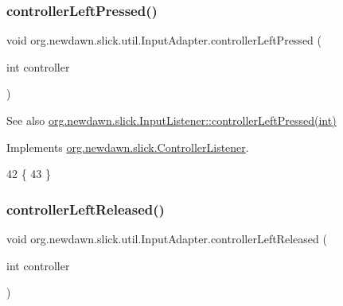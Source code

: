 \subsubsection{\texorpdfstring{controller\+Left\+Pressed()}{controllerLeftPressed()}}
{\footnotesize\ttfamily void org.\+newdawn.\+slick.\+util.\+Input\+Adapter.\+controller\+Left\+Pressed (\begin{DoxyParamCaption}\item[{int}]{controller }\end{DoxyParamCaption})\hspace{0.3cm}{\ttfamily [inline]}}

\begin{DoxySeeAlso}{See also}
\mbox{\hyperlink{interfaceorg_1_1newdawn_1_1slick_1_1_controller_listener_abfb38c5d8e44b7613a49cbfaf19d5585}{org.\+newdawn.\+slick.\+Input\+Listener\+::controller\+Left\+Pressed(int)}} 
\end{DoxySeeAlso}


Implements \mbox{\hyperlink{interfaceorg_1_1newdawn_1_1slick_1_1_controller_listener_abfb38c5d8e44b7613a49cbfaf19d5585}{org.\+newdawn.\+slick.\+Controller\+Listener}}.


\begin{DoxyCode}
42                                                       \{
43     \}
\end{DoxyCode}
\mbox{\label{classorg_1_1newdawn_1_1slick_1_1util_1_1_input_adapter_af1419aca62539a39f52be90f64e778e3}} 
\subsubsection{\texorpdfstring{controller\+Left\+Released()}{controllerLeftReleased()}}
{\footnotesize\ttfamily void org.\+newdawn.\+slick.\+util.\+Input\+Adapter.\+controller\+Left\+Released (\begin{DoxyParamCaption}\item[{int}]{controller }\end{DoxyParamCaption})\hspace{0.3cm}{\ttfamily [inline]}}

